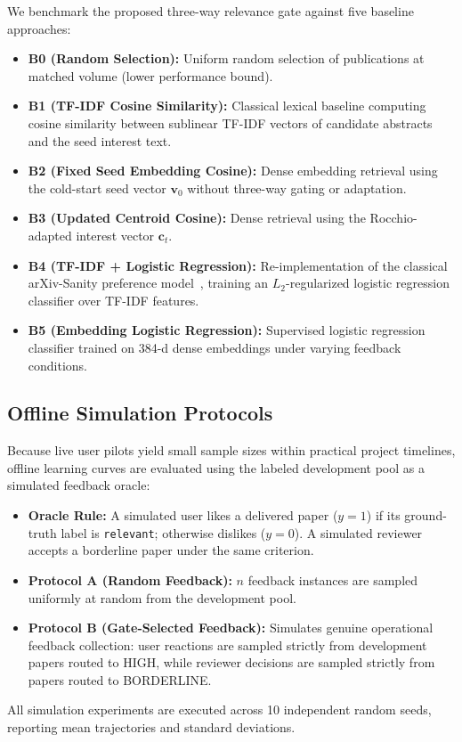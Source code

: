 We benchmark the proposed three-way relevance gate against five baseline approaches:
\begin{itemize}
    \item \textbf{B0 (Random Selection):} Uniform random selection of publications at matched volume (lower performance bound).
    \item \textbf{B1 (TF-IDF Cosine Similarity):} Classical lexical baseline computing cosine similarity between sublinear TF-IDF vectors of candidate abstracts and the seed interest text.
    \item \textbf{B2 (Fixed Seed Embedding Cosine):} Dense embedding retrieval using the cold-start seed vector $\mathbf{v}_0$ without three-way gating or adaptation.
    \item \textbf{B3 (Updated Centroid Cosine):} Dense retrieval using the Rocchio-adapted interest vector $\mathbf{c}_t$.
    \item \textbf{B4 (TF-IDF + Logistic Regression):} Re-implementation of the classical arXiv-Sanity preference model~\cite{karpathy2015arxivsanity}, training an $L_2$-regularized logistic regression classifier over TF-IDF features.
    \item \textbf{B5 (Embedding Logistic Regression):} Supervised logistic regression classifier trained on 384-d dense embeddings under varying feedback conditions.
\end{itemize}

\subsection{Offline Simulation Protocols}
\label{sec:sim_protocols}

Because live user pilots yield small sample sizes within practical project timelines, offline learning curves are evaluated using the labeled development pool as a simulated feedback oracle:
\begin{itemize}
    \item \textbf{Oracle Rule:} A simulated user likes a delivered paper ($y=1$) if its ground-truth label is \texttt{relevant}; otherwise dislikes ($y=0$). A simulated reviewer accepts a borderline paper under the same criterion.
    \item \textbf{Protocol A (Random Feedback):} $n$ feedback instances are sampled uniformly at random from the development pool.
    \item \textbf{Protocol B (Gate-Selected Feedback):} Simulates genuine operational feedback collection: user reactions are sampled strictly from development papers routed to HIGH, while reviewer decisions are sampled strictly from papers routed to BORDERLINE.
\end{itemize}

All simulation experiments are executed across 10 independent random seeds, reporting mean trajectories and standard deviations.
